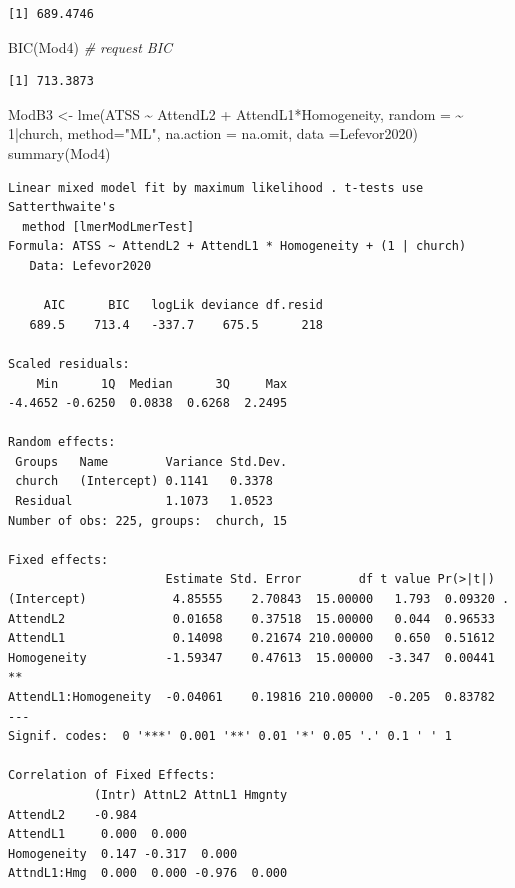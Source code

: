 \documentclass[
  11pt,
]{book}
\newenvironment{Shaded}{\begin{snugshade}}{\end{snugshade}}
\newcommand{\AttributeTok}[1]{\textcolor[rgb]{0.77,0.63,0.00}{#1}}
\newcommand{\CommentTok}[1]{\textcolor[rgb]{0.56,0.35,0.01}{\textit{#1}}}
\newcommand{\DecValTok}[1]{\textcolor[rgb]{0.00,0.00,0.81}{#1}}
\newcommand{\FunctionTok}[1]{\textcolor[rgb]{0.00,0.00,0.00}{#1}}
\newcommand{\NormalTok}[1]{#1}
\newcommand{\OtherTok}[1]{\textcolor[rgb]{0.56,0.35,0.01}{#1}}
\newcommand{\SpecialCharTok}[1]{\textcolor[rgb]{0.00,0.00,0.00}{#1}}
\newcommand{\StringTok}[1]{\textcolor[rgb]{0.31,0.60,0.02}{#1}}
\begin{document}
\begin{verbatim}
[1] 689.4746
\end{verbatim}

\begin{Shaded}
\begin{Highlighting}[]
\FunctionTok{BIC}\NormalTok{(Mod4) }\CommentTok{\# request BIC}
\end{Highlighting}
\end{Shaded}

\begin{verbatim}
[1] 713.3873
\end{verbatim}

\begin{Shaded}
\begin{Highlighting}[]
\NormalTok{ModB3 }\OtherTok{\textless{}{-}} \FunctionTok{lme}\NormalTok{(ATSS }\SpecialCharTok{\textasciitilde{}}\NormalTok{  AttendL2 }\SpecialCharTok{+}\NormalTok{ AttendL1}\SpecialCharTok{*}\NormalTok{Homogeneity, }\AttributeTok{random =} \SpecialCharTok{\textasciitilde{}} \DecValTok{1}\SpecialCharTok{|}\NormalTok{church, }\AttributeTok{method=}\StringTok{"ML"}\NormalTok{, }\AttributeTok{na.action =}\NormalTok{ na.omit, }\AttributeTok{data =}\NormalTok{Lefevor2020)}
\FunctionTok{summary}\NormalTok{(Mod4)}
\end{Highlighting}
\end{Shaded}

\begin{verbatim}
Linear mixed model fit by maximum likelihood . t-tests use Satterthwaite's
  method [lmerModLmerTest]
Formula: ATSS ~ AttendL2 + AttendL1 * Homogeneity + (1 | church)
   Data: Lefevor2020

     AIC      BIC   logLik deviance df.resid 
   689.5    713.4   -337.7    675.5      218 

Scaled residuals: 
    Min      1Q  Median      3Q     Max 
-4.4652 -0.6250  0.0838  0.6268  2.2495 

Random effects:
 Groups   Name        Variance Std.Dev.
 church   (Intercept) 0.1141   0.3378  
 Residual             1.1073   1.0523  
Number of obs: 225, groups:  church, 15

Fixed effects:
                      Estimate Std. Error        df t value Pr(>|t|)   
(Intercept)            4.85555    2.70843  15.00000   1.793  0.09320 . 
AttendL2               0.01658    0.37518  15.00000   0.044  0.96533   
AttendL1               0.14098    0.21674 210.00000   0.650  0.51612   
Homogeneity           -1.59347    0.47613  15.00000  -3.347  0.00441 **
AttendL1:Homogeneity  -0.04061    0.19816 210.00000  -0.205  0.83782   
---
Signif. codes:  0 '***' 0.001 '**' 0.01 '*' 0.05 '.' 0.1 ' ' 1

Correlation of Fixed Effects:
            (Intr) AttnL2 AttnL1 Hmgnty
AttendL2    -0.984                     
AttendL1     0.000  0.000              
Homogeneity  0.147 -0.317  0.000       
AttndL1:Hmg  0.000  0.000 -0.976  0.000
\end{verbatim}
\end{document}
